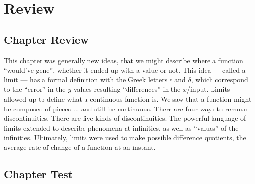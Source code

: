 \section{Review}
\subsection{Chapter Review}
This chapter was generally new ideas, that we might describe where a function ``would've gone'',
whether it ended up with a value or not.  This idea --- called a limit --- has a formal definition with
the Greek letters $\epsilon$ and $\delta$, which correspond to the ``error'' in the $y$ values
resulting ``differences'' in the $x$/input.  Limits allowed up to define what a continuous 
function is.  We saw that a function might be composed of pieces ... and still be continuous.
There are four ways to remove discontinuities.  There are five kinds of discontinuities.
The powerful language of limits extended to describe phenomena at infinities, as well as ``values'' 
of the infinities.  Ultimately, limits were used to make possible difference quotients, the 
average rate of change of a function at an instant.

\subsection{Chapter Test}